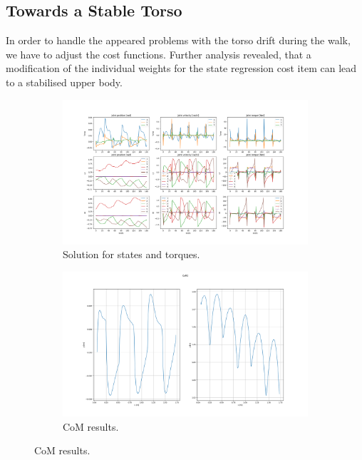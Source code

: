 \subsection{Towards a Stable Torso}
In order to handle the appeared problems with the torso drift during the walk, we have to adjust the cost functions. Further analysis revealed, that a modification of the individual weights for the state regression cost item can lead to a stabilised upper body.
\begin{figure}[h!]
\centering
\begin{subfigure}{.5\textwidth}
  \centering
  \includegraphics[width=1\linewidth]{Media/Crocoddyl/RH5Torso/FixTorsoFalling/RH5TorsoGait_FixFalling_Solution.png}
  \caption{Solution for states and torques.}
\end{subfigure}
\begin{subfigure}{.5\textwidth}
  \centering
\includegraphics[width=1\linewidth]{Media/Crocoddyl/RH5Torso/FixTorsoFalling/RH5TorsoGait_FixFalling_CoM2.png}
\caption{CoM results.}
\end{subfigure}

\end{figure}
